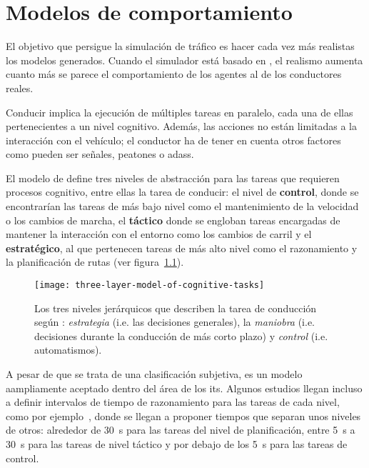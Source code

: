 \chapter{Modelos de comportamiento}
\label{ch:sota-behavior-models}

El objetivo que persigue la simulación de tráfico es hacer cada vez más realistas los modelos generados. Cuando el simulador está basado en , el realismo aumenta cuanto más se parece el comportamiento de los agentes al de los conductores reales.

Conducir implica la ejecución de múltiples tareas en paralelo, cada una de ellas pertenecientes a un nivel cognitivo. Además, las acciones no están limitadas a la interacción con el vehículo; el conductor ha de tener en cuenta otros factores como pueden ser señales, peatones o \glspl{adas}.

El modelo de \cite{michon1985critical} define tres niveles de abstracción para las tareas que requieren procesos cognitivo, entre ellas la tarea de conducir: el nivel de \textbf{control}, donde se encontrarían las tareas de más bajo nivel como el mantenimiento de la velocidad o los cambios de marcha, el \textbf{táctico} donde se engloban tareas encargadas de mantener la interacción con el entorno como los cambios de carril y el \textbf{estratégico}, al que pertenecen tareas de más alto nivel como el razonamiento y la planificación de rutas (ver figura~\ref{fig:three-levels-of-human-driving}).

\begin{figure}
	\centering
	\texttt{[image: three-layer-model-of-cognitive-tasks]}
	\caption[Los tres niveles jerárquicos de la conducción]{Los tres niveles jerárquicos que describen la tarea de conducción según \cite{michon1985critical}: \textit{estrategia} (i.e. las decisiones generales), la \textit{maniobra} (i.e. decisiones durante la conducción de más corto plazo) y \textit{control} (i.e. automatismos).}
	\label{fig:three-levels-of-human-driving}
\end{figure}

A pesar de que se trata de una clasificación subjetiva, es un modelo aampliamente aceptado dentro del área de los \gls{its}. Algunos estudios llegan incluso a definir intervalos de tiempo de razonamiento para las tareas de cada nivel, como por ejemplo~\cite{Alexiadis2004}, donde se llegan a proponer tiempos que separan unos niveles de otros: alrededor de \SI{30}{\second} para las tareas del nivel de planificación, entre \SI{5}{\second} a \SI{30}{\second} para las tareas de nivel táctico y por debajo de los \SI{5}{\second} para las tareas de control.

